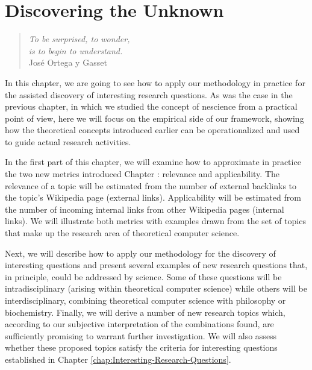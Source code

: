 %
%


\chapter{Discovering the Unknown}
\label{chap:computational-creativity}

\begin{quote}
\begin{flushright}
\emph{To be surprised, to wonder, \\
is to begin to understand.}\\
José Ortega y Gasset \\
\end{flushright}
\end{quote}
\bigskip

In this chapter, we are going to see how to apply our methodology in practice for the assisted discovery of interesting research questions. As was the case in the previous chapter, in which we studied the concept of nescience from a practical point of view, here we will focus on the empirical side of our framework, showing how the theoretical concepts introduced earlier can be operationalized and used to guide actual research activities.

In the first part of this chapter, we will examine how to approximate in practice the two new metrics introduced Chapter \label{chap:Interesting-Research-Questions}: relevance and applicability. The relevance of a topic will be estimated from the number of external backlinks to the topic's Wikipedia page (external links). Applicability will be estimated from the number of incoming internal links from other Wikipedia pages (internal links). We will illustrate both metrics with examples drawn from the set of topics that make up the research area of theoretical computer science.

Next, we will describe how to apply our methodology for the discovery of interesting questions and present several examples of new research questions that, in principle, could be addressed by science. Some of these questions will be intradisciplinary (arising within theoretical computer science) while others will be interdisciplinary, combining theoretical computer science with philosophy or biochemistry. Finally, we will derive a number of new research topics which, according to our subjective interpretation of the combinations found, are sufficiently promising to warrant further investigation. We will also assess whether these proposed topics satisfy the criteria for interesting questions established in Chapter \ref{chap:Interesting-Research-Questions}.

